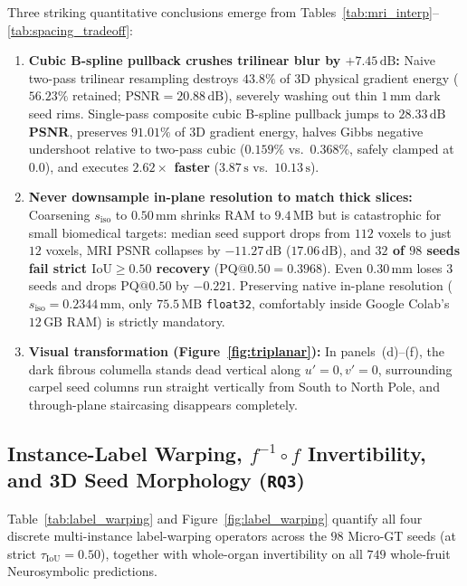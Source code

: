 \documentclass[10pt,a4paper]{article}
\renewcommand{\_}{\origunderscore\allowbreak}
\begin{document}
Three striking quantitative conclusions emerge from Tables~\ref{tab:mri_interp}--\ref{tab:spacing_tradeoff}:
\begin{enumerate}
    \item \textbf{Cubic B-spline pullback crushes trilinear blur by $+7.45\,\text{dB}$:} Naive two-pass trilinear resampling destroys \textbf{$43.8\%$} of 3D physical gradient energy ($56.23\%$ retained; $\text{PSNR} = 20.88\,\text{dB}$), severely washing out thin $1\,\text{mm}$ dark seed rims. Single-pass composite cubic B-spline pullback jumps to \textbf{$28.33\,\text{dB}$ PSNR}, preserves \textbf{$91.01\%$} of 3D gradient energy, halves Gibbs negative undershoot relative to two-pass cubic ($0.159\%$ vs.\ $0.368\%$, safely clamped at $0.0$), and executes \textbf{$2.62\times$ faster} ($3.87\,\text{s}$ vs.\ $10.13\,\text{s}$).
    \item \textbf{Never downsample in-plane resolution to match thick slices:} Coarsening $s_{\text{iso}}$ to $0.50\,\text{mm}$ shrinks RAM to $9.4\,\text{MB}$ but is catastrophic for small biomedical targets: median seed support drops from $112$ voxels to just $12$ voxels, MRI PSNR collapses by $-11.27\,\text{dB}$ ($17.06\,\text{dB}$), and \textbf{$32$ of $98$ seeds fail strict $\text{IoU}\ge 0.50$ recovery} ($\text{PQ@0.50} = 0.3968$). Even $0.30\,\text{mm}$ loses $3$ seeds and drops $\text{PQ@0.50}$ by $-0.221$. Preserving native in-plane resolution ($s_{\text{iso}} = 0.2344\,\text{mm}$, only $75.5\,\text{MB}$ \texttt{float32}, comfortably inside Google Colab's $12\,\text{GB}$ RAM) is strictly mandatory.
    \item \textbf{Visual transformation (Figure~\ref{fig:triplanar}):} In panels~(d)--(f), the dark fibrous columella stands dead vertical along $u'=0, v'=0$, surrounding carpel seed columns run straight vertically from South to North Pole, and through-plane staircasing disappears completely.
\end{enumerate}

\subsection{Instance-Label Warping, $f^{-1}\circ f$ Invertibility, and 3D Seed Morphology (\texttt{RQ3})}
\label{sec:res_labels}

Table~\ref{tab:label_warping} and Figure~\ref{fig:label_warping} quantify all four discrete multi-instance label-warping operators across the $98$ Micro-GT seeds (at strict $\tau_{\text{IoU}} = 0.50$), together with whole-organ invertibility on all $749$ whole-fruit Neurosymbolic predictions.
\end{document}
